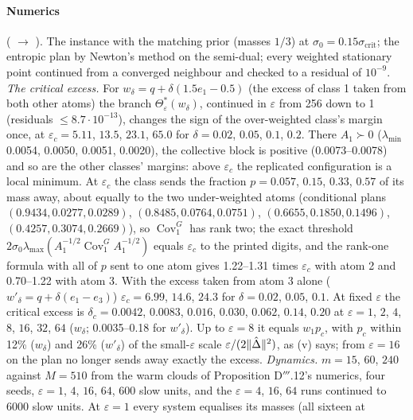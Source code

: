 \paragraph{Numerics} ( $\to$ ). The instance with
the matching prior (masses $1/3$) at $\sigma_0 = 0.15\sigma_{\mathrm{crit}}$; the entropic plan by Newton's method on
the semi-dual; every weighted stationary point continued from a converged neighbour and checked to a residual of
$10^{-9}$. \emph{The critical excess.} For $w_\delta = q + \delta(1.5e_1 - 0.5)$ (the excess of class 1 taken from
both other atoms) the branch $\Theta^*_\varepsilon(w_\delta)$, continued in $\varepsilon$ from 256 down to 1
(residuals $\le8.7\cdot10^{-13}$), changes the sign of the over-weighted class's margin once, at
$\varepsilon_c = 5.11$, $13.5$, $23.1$, $65.0$ for $\delta = 0.02$, $0.05$, $0.1$, $0.2$. There $A_1\succ0$
($\lambda_{\min}$ 0.0054, 0.0050, 0.0051, 0.0020), the collective block is positive (0.0073--0.0078) and so are the
other classes' margins: above $\varepsilon_c$ the replicated configuration is a local minimum. At $\varepsilon_c$ the
class sends the fraction $p = 0.057$, $0.15$, $0.33$, $0.57$ of its mass away, about equally to the two
under-weighted atoms (conditional plans $(0.9434,0.0277,0.0289)$, $(0.8485,0.0764,0.0751)$,
$(0.6655,0.1850,0.1496)$, $(0.4257,0.3074,0.2669)$), so $\operatorname{Cov}^G_1$ has rank two; the exact threshold
$2\sigma_0\lambda_{\max}(A_1^{-1/2}\operatorname{Cov}^G_1A_1^{-1/2})$ equals $\varepsilon_c$ to the printed digits,
and the rank-one formula with all of $p$ sent to one atom gives 1.22--1.31 times $\varepsilon_c$ with atom 2 and
0.70--1.22 with atom 3. With the excess taken from atom 3 alone ($w'_\delta = q + \delta(e_1 - e_3)$)
$\varepsilon_c = 6.99$, $14.6$, $24.3$ for $\delta = 0.02$, $0.05$, $0.1$. At fixed $\varepsilon$ the critical
excess is $\delta_c = 0.0042$, $0.0083$, $0.016$, $0.030$, $0.062$, $0.14$, $0.20$ at $\varepsilon = 1$, $2$, $4$,
$8$, $16$, $32$, $64$ ($w_\delta$; 0.0035--0.18 for $w'_\delta$). Up to $\varepsilon = 8$ it equals $w_1p_c$, with
$p_c$ within 12\% ($w_\delta$) and 26\% ($w'_\delta$) of the small-$\varepsilon$ scale
$\varepsilon/(2\lVert \hat\Delta\rVert^2)$, as (v) says; from $\varepsilon = 16$ on the plan no longer sends away exactly
the excess. \emph{Dynamics.} $m = 15$, $60$, $240$ against $M = 510$ from the warm clouds of Proposition
D$'''$.12's numerics, four seeds, $\varepsilon = 1$, $4$, $16$, $64$, 600 slow units, and the $\varepsilon = 4$,
$16$, $64$ runs continued to 6000 slow units. At $\varepsilon = 1$ every system equalises its masses (all sixteen at
